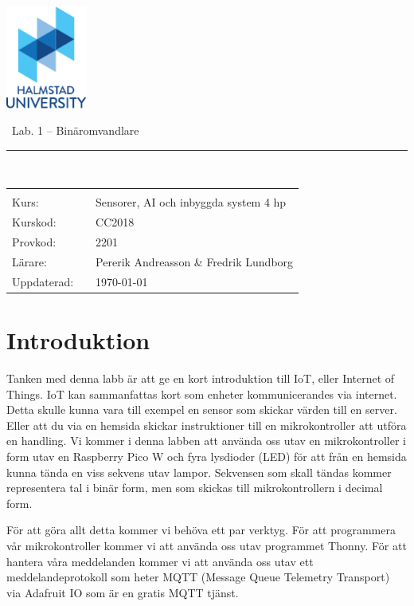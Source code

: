 \documentclass{article}
\newcommand{\kursnamn}{Sensorer, AI och inbyggda system 4 hp}
\newcommand{\kurskod}{CC2018}
\newcommand{\provkod}{2201}
\begin{document}
  \includegraphics[width=0.2\textwidth]{bilder/HH_ENG_color_small.pdf}

\vspace{5mm}
  
	\begin{center}
 \
	{\Huge{}Lab. 1 -- Binäromvandlare}
	\end{center}
\noindent\rule{\textwidth}{2pt}
\\


{\Large
\begin{tabular}{p{2cm}p{1cm}p{10cm}}
&  &  \\
Kurs: & 	& 	\kursnamn \\
Kurskod: & & \kurskod \\
Provkod: &  & \provkod \\
L\"arare: &  & Pererik Andreasson \& Fredrik Lundborg\\
Uppdaterad: & & \today
\end{tabular}
}

\pagebreak

\tableofcontents


\section{Introduktion}
Tanken med denna labb är att ge en kort introduktion till IoT, eller Internet of Things. IoT kan sammanfattas kort som enheter kommunicerandes via internet. Detta skulle kunna vara till exempel en sensor som skickar värden till en server. Eller att du via en hemsida skickar instruktioner till en mikrokontroller att utföra en handling. Vi kommer i denna labben att använda oss utav en mikrokontroller i form utav en Raspberry Pico W och fyra lysdioder (LED) för att från en hemsida kunna tända en viss sekvens utav lampor. Sekvensen som skall tändas kommer representera tal i binär form, men som skickas till mikrokontrollern i decimal form.

För att göra allt detta kommer vi behöva ett par verktyg. För att programmera vår mikrokontroller kommer vi att använda oss utav programmet Thonny. För att hantera våra meddelanden kommer vi att använda oss utav ett meddelandeprotokoll som heter MQTT (Message Queue Telemetry Transport) via Adafruit IO som är en gratis MQTT tjänst.
\end{document}
